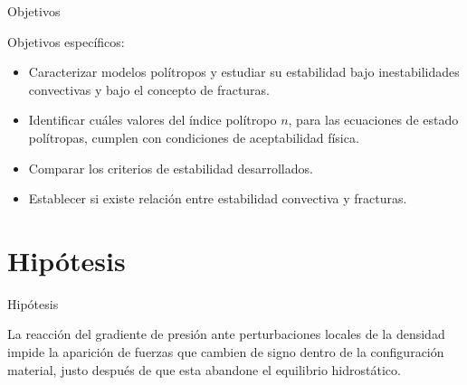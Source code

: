 \documentclass[handout,t]{beamer}
\begin{document}
\begin{frame}{Objetivos}


Objetivos específicos:
\vspace{4mm}
\begin{itemize}
\justifying
\item Caracterizar modelos polítropos y estudiar su estabilidad bajo inestabilidades convectivas y bajo el concepto de fracturas.
\vspace{2mm}

\item Identificar cuáles valores del índice polítropo $n$, para las ecuaciones de estado polítropas, cumplen con condiciones de aceptabilidad física.
\vspace{2mm}

\item Comparar los criterios de estabilidad desarrollados.
\vspace{2mm}

\item Establecer si existe relación entre estabilidad convectiva y fracturas.

\end{itemize}



\end{frame}






\section{Hipótesis}
\begin{frame}{Hipótesis}

\vspace{14mm}

\justifying
La reacción del gradiente de presión ante perturbaciones locales de la densidad impide la aparición de fuerzas que cambien de signo dentro de la configuración
material, justo después de que esta abandone el equilibrio hidrostático.



\end{frame}
\end{document}

